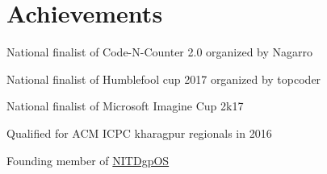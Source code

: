 \documentclass[letterpaper]{deedy-resume} %
\begin{document}
\begin{minipage}[t]{0.66\textwidth}
\sectionspace


\section{Achievements}

\sectionspace

\begin{tightitemize}
\item National finalist of Code-N-Counter 2.0 organized by Nagarro\\
\item National finalist of Humblefool cup 2017 organized by topcoder\\
\item National finalist of Microsoft Imagine Cup 2k17\\
\item Qualified for ACM ICPC kharagpur regionals in 2016\\
\item Founding member of \href{https://github.com/NIT-dgp}{NITDgpOS}
\end{tightitemize}



\end{minipage} %
\end{document}
